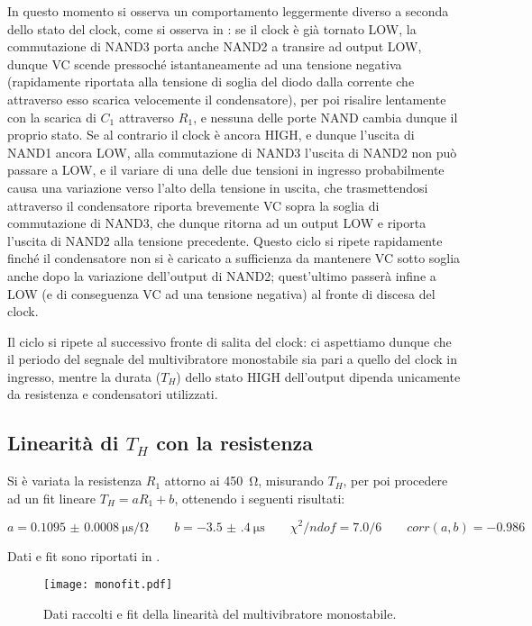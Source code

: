 In questo momento si osserva un comportamento leggermente diverso a seconda
dello stato del clock, come si osserva in : se il clock è già tornato LOW, la commutazione di NAND3
porta anche NAND2 a transire ad output LOW, dunque VC scende pressoché
istantaneamente ad una tensione negativa (rapidamente riportata alla tensione
di soglia del diodo dalla corrente che attraverso esso scarica velocemente il
condensatore), per poi risalire lentamente con la scarica di $C_1$ attraverso
$R_1$, e nessuna delle porte NAND cambia dunque il proprio stato.
Se al contrario il clock è ancora HIGH, e dunque l'uscita di NAND1 ancora LOW,
alla commutazione di NAND3 l'uscita di NAND2 non può passare a LOW, e il variare
di una delle due tensioni in ingresso probabilmente causa una variazione verso
l'alto della tensione in uscita, che trasmettendosi
attraverso il condensatore riporta brevemente VC sopra la soglia di
commutazione di NAND3, che dunque ritorna ad un output LOW e riporta l'uscita
di NAND2 alla tensione precedente. Questo ciclo si ripete rapidamente finché
il condensatore non si è caricato a sufficienza da mantenere VC sotto soglia
anche dopo la variazione dell'output di NAND2; quest'ultimo passerà infine a
LOW (e di conseguenza VC ad una tensione negativa) al fronte di discesa del
clock.

Il ciclo si ripete al successivo fronte di salita del clock: ci aspettiamo
dunque che il periodo del segnale del multivibratore monostabile sia pari a
quello del clock in ingresso, mentre la durata ($T_H$) dello stato HIGH
dell'output dipenda unicamente da resistenza e condensatori utilizzati.

\subsection{Linearità di $T_H$ con la resistenza}

Si è variata la resistenza $R_1$ attorno ai \SI{450}{\ohm}, misurando $T_H$, per
poi procedere ad un fit lineare $T_H = a R_1 + b$, ottenendo i seguenti risultati:

$$a = \SI{0.1095(8)}{\micro\second \per \ohm} \qquad b=\SI{-3.5(4)}{\micro \second} \qquad \chi^2/ndof = 7.0/6 \qquad corr(a,b)= -0.986$$

Dati e fit sono riportati in .

\begin{figure}[h]
	\centering
	\texttt{[image: monofit.pdf]}
	\caption{Dati raccolti e fit della linearità del multivibratore monostabile.}
	\label{monofit}
\end{figure}
